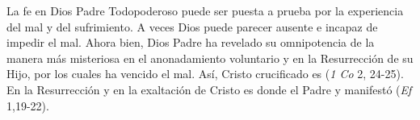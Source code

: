
 La fe en Dios Padre Todopoderoso puede ser puesta a prueba por la experiencia del mal y del sufrimiento. A veces Dios puede parecer ausente e incapaz de impedir el mal. Ahora bien, Dios Padre ha revelado su omnipotencia de la manera más misteriosa en el anonadamiento voluntario y en la Resurrección de su Hijo, por los cuales ha vencido el mal. Así, Cristo crucificado es  (\emph{1 Co} 2, 24-25). En la Resurrección y en la exaltación de Cristo es donde el Padre  y manifestó  (\emph{Ef} 1,19-22).